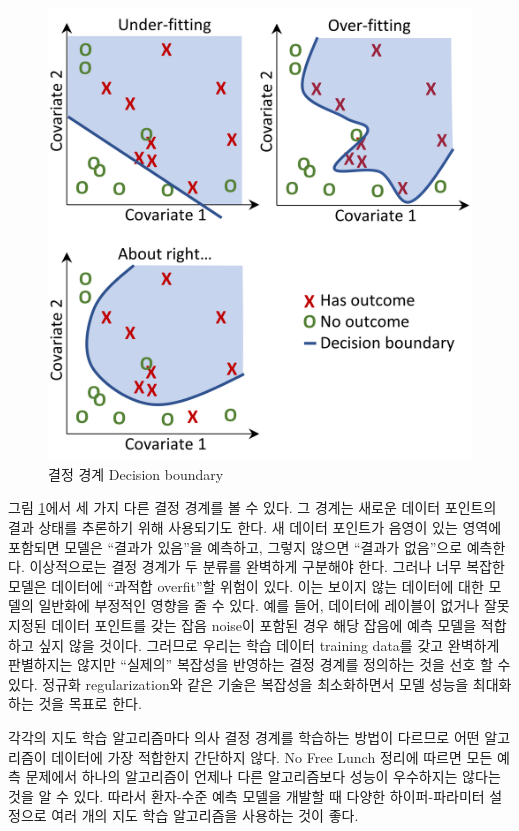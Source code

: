 \documentclass[10.5pt]{book}
\theoremstyle{definition}
\theoremstyle{definition}
\theoremstyle{definition}
\theoremstyle{remark}
\begin{document}
\begin{figure}

{\centering \includegraphics[width=0.8\linewidth]{images/PatientLevelPrediction/decisionBoundary} 

}

\caption{결정 경계 Decision boundary}\label{fig:decisionBoundary}
\end{figure}

그림 \ref{fig:decisionBoundary}에서 세 가지 다른 결정 경계를 볼 수 있다.
그 경계는 새로운 데이터 포인트의 결과 상태를 추론하기 위해 사용되기도
한다. 새 데이터 포인트가 음영이 있는 영역에 포함되면 모델은 ``결과가
있음''을 예측하고, 그렇지 않으면 ``결과가 없음''으로 예측한다.
이상적으로는 결정 경계가 두 분류를 완벽하게 구분해야 한다. 그러나 너무
복잡한 모델은 데이터에 ``과적합 overfit''할 위험이 있다. 이는 보이지
않는 데이터에 대한 모델의 일반화에 부정적인 영향을 줄 수 있다. 예를
들어, 데이터에 레이블이 없거나 잘못 지정된 데이터 포인트를 갖는 잡음
noise이 포함된 경우 해당 잡음에 예측 모델을 적합하고 싶지 않을 것이다.
그러므로 우리는 학습 데이터 training data를 갖고 완벽하게 판별하지는
않지만 ``실제의'' 복잡성을 반영하는 결정 경계를 정의하는 것을 선호 할 수
있다. 정규화 regularization와 같은 기술은 복잡성을 최소화하면서 모델
성능을 최대화하는 것을 목표로 한다.

각각의 지도 학습 알고리즘마다 의사 결정 경계를 학습하는 방법이 다르므로
어떤 알고리즘이 데이터에 가장 적합한지 간단하지 않다. No Free Lunch
정리에 따르면 모든 예측 문제에서 하나의 알고리즘이 언제나 다른
알고리즘보다 성능이 우수하지는 않다는 것을 알 수
있다. 따라서 환자-수준 예측 모델을 개발할 때 다양한
하이퍼-파라미터 설정으로 여러 개의 지도 학습 알고리즘을 사용하는 것이
좋다.
\end{document}

